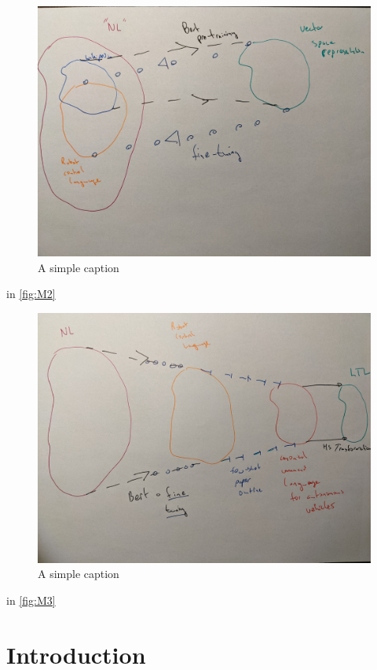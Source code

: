\documentclass[a4paper, 11pt]{article}
\begin{document}
\begin{figure}[H]
\centering
\includegraphics[width=150mm]{pics/two.jpg}
\caption{A simple caption}\label{fig:M2}
\end{figure}

in \autoref{fig:M2}

\begin{figure}[H]
\centering
\includegraphics[width=150mm]{pics/three.jpg}
\caption{A simple caption}\label{fig:M3}
\end{figure}

in \autoref{fig:M3}

\section{Introduction}
\end{document}
